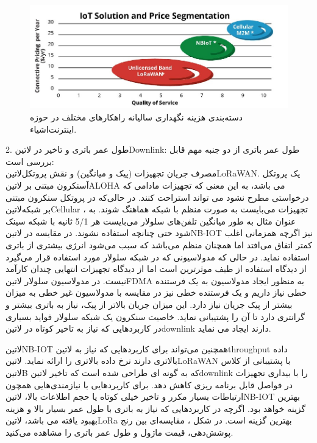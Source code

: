 \begin{figure}[!h]
	\includegraphics[width=\linewidth]{Assets/loracost.png}
	\caption{دسته‌بندی هزینه نگهداری سالیانه راهکارهای مختلف در حوزه اینترنت‌اشیاء.}
	\label{fig:loracost}
\end{figure}

2. طول عمر باتری و تاخیر در ‌لاتین{Downlink}: طول عمر باتری از دو جنبه مهم قابل بررسی است: \\
مصرف جریان تجهیزات (پیک و میانگین) و نقش پروتکل‌لاتین{LoRaWAN}. یک پروتکل آسنکرون مبتنی بر ‌لاتین{ALOHA} می باشد، به این معنی که تجهیزات مادامی که درخواستی مطرح نشود می تواند استراحت کنند. در حالی‌که در پروتکل سنکرون مبتنی بر شبکه‌لاتین{Cellular} ، تجهیزات می‌بایست به صورت منظم با شبکه هماهنگ شوند. به عنوان مثال به طور میانگین تلفن‌های سلولار می‌بایست هر 5/1 ثانیه با شبکه سینک شود حتی چنانچه استفاده نشوند. در مقایسه در ‌لاتین{NB-IOT} نیز اگرچه همزمانی اغلب کمتر اتفاق می‌افتد اما همچنان منظم می‌باشد که سبب می‌شود انرژی بیشتری از باتری استفاده نماید. در حالی که مدولاسیونی که در شبکه سلولار مورد استفاده قرار می‌گیرد از دیدگاه استفاده از طیف موثرترین است اما از دیدگاه تجهیزات انتهایی چندان کارآمد نیست. در مدولاسیون سلولار ‌لاتین{FDMA} به منظور ایجاد مدولاسیون به یک فرستنده خطی نیاز داریم و یک فرستنده خطی نیز در مقایسه با مدولاسیون غیر خطی به میزان بیشتر از پیک جریان نیاز دارد. این میزان جریان بالاتر از پیک، نیاز به باتری بیشتر و گرانتری دارد تا آن را پشتیبانی نماید. خاصیت سنکرون یک شبکه سلولار فواید بسیاری در کاربردهایی که نیاز به تاخیر کوتاه در ‌لاتین{downlink} دارند ایجاد می نماید.

‌لاتین{NB-IOT} همچنین می‌تواند برای کاربردهایی که نیاز به ‌لاتین{throughput} داده بالاتری دارند نرخ داده بالاتری را ارائه نماید. ‌لاتین{LoRaWAN} با پشتیبانی از کلاس ‌لاتین{B} که به گونه ای طراحی شده است که تاخیر ‌لاتین{downlink} را با بیداری تجهیزات در فواصل قابل برنامه ریزی کاهش دهد. برای کاربردهایی با نیازمندی‌هایی همچون ارتباطات بسیار مکرر و تاخیر خیلی کوتاه یا حجم اطلاعات بالا، ‌لاتین{NB-IOT} بهترین گزینه خواهد بود. اگرچه در کاربردهایی که نیاز به باتری با طول عمر بسیار بالا و هزینه بهبود یافته می باشد، ‌لاتین{LoRa} بهترین گزینه است. در شکل ، مقایسه‌ای بین رنج پوشش‌دهی، قیمت ماژول و طول عمر باتری را مشاهده می‌کنید.

